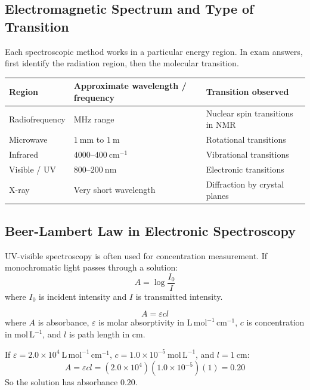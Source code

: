 \documentclass[12pt,a4paper]{article}
\begin{document}
\subsection{Electromagnetic Spectrum and Type of Transition}
Each spectroscopic method works in a particular energy region. In exam answers, first identify the radiation region, then the molecular transition.

\begin{tabularx}{\linewidth}{|B{3.0cm}|Y|Y|}
\hline
\textbf{Region} & \textbf{Approximate wavelength / frequency} & \textbf{Transition observed} \\
\hline
Radiofrequency & MHz range & Nuclear spin transitions in NMR \\
\hline
Microwave & $1\ \mathrm{mm}$ to $1\ \mathrm{m}$ & Rotational transitions \\
\hline
Infrared & $4000$--$400\ \mathrm{cm^{-1}}$ & Vibrational transitions \\
\hline
Visible / UV & $800$--$200\ \mathrm{nm}$ & Electronic transitions \\
\hline
X-ray & Very short wavelength & Diffraction by crystal planes \\
\hline
\end{tabularx}

\subsection{Beer-Lambert Law in Electronic Spectroscopy}
UV-visible spectroscopy is often used for concentration measurement. If monochromatic light passes through a solution:
\[
A=\log\frac{I_0}{I}
\]
where $I_0$ is incident intensity and $I$ is transmitted intensity.

\begin{tcolorbox}[formulabox, title={Beer-Lambert Law}]
\[
A=\varepsilon c l
\]
where $A$ is absorbance, $\varepsilon$ is molar absorptivity in $\mathrm{L\,mol^{-1}\,cm^{-1}}$, $c$ is concentration in $\mathrm{mol\,L^{-1}}$, and $l$ is path length in cm.
\end{tcolorbox}

\begin{tcolorbox}[examplebox, title={Solved Example: Absorbance}]
If $\varepsilon=2.0\times10^4\ \mathrm{L\,mol^{-1}\,cm^{-1}}$, $c=1.0\times10^{-5}\ \mathrm{mol\,L^{-1}}$, and $l=1\ \mathrm{cm}$:
\[
A=\varepsilon cl=(2.0\times10^4)(1.0\times10^{-5})(1)=0.20
\]
So the solution has absorbance $0.20$.
\end{tcolorbox}
\end{document}

